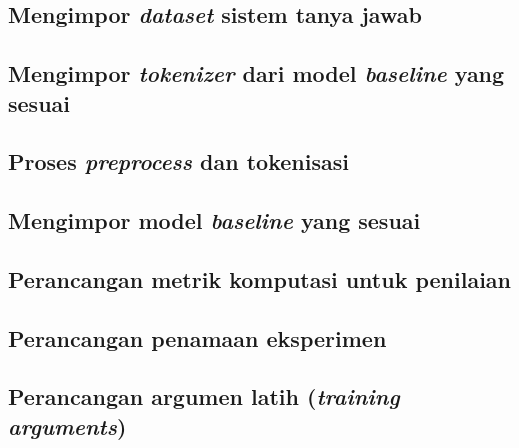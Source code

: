 \subsection{Mengimpor \emph{dataset} sistem tanya jawab}

\subsection{Mengimpor \emph{tokenizer} dari model \emph{baseline} yang sesuai}

\subsection{Proses \emph{preprocess} dan tokenisasi}

\subsection{Mengimpor model \emph{baseline} yang sesuai}

\subsection{Perancangan metrik komputasi untuk penilaian}

\subsection{Perancangan penamaan eksperimen}

\subsection{Perancangan argumen latih (\emph{training arguments})}

